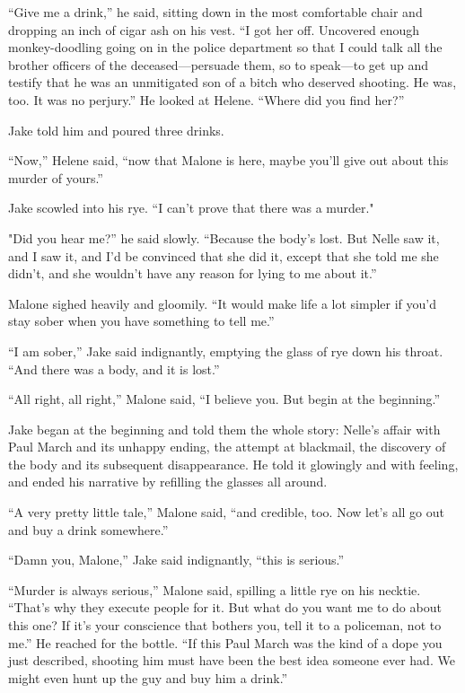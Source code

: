 \documentclass{novel}
\begin{document}
“Give me a drink,” he said, sitting down in the most comfortable chair and dropping an inch of cigar ash on his vest. “I got her off. Uncovered enough monkey-doodling going on in the police department so that I could talk all the brother officers of the deceased—persuade them, so to speak—to get up and testify that he was an unmitigated son of a bitch who deserved shooting. He was, too. It was no perjury.” He looked at Helene. “Where did you find her?”

Jake told him and poured three drinks.

“Now,” Helene said, “now that Malone is here, maybe you’ll give out about this murder of yours.”

Jake scowled into his rye. “I can’t prove that there was a murder."

"Did you hear me?” he said slowly. “Because the body’s lost. But Nelle saw it, and I saw it, and I'd be convinced that she did it, except that she told me she didn’t, and she wouldn’t have any reason for lying to me about it.”

Malone sighed heavily and gloomily. “It would make life a lot simpler if you’d stay sober when you have something to tell me.”

“I am sober,” Jake said indignantly, emptying the glass of rye down his throat. “And there was a body, and it is lost.”

“All right, all right,” Malone said, “I believe you. But begin at the beginning.”

Jake began at the beginning and told them the whole story: Nelle’s affair with Paul March and its unhappy ending, the attempt at blackmail, the discovery of the body and its subsequent disappearance. He told it glowingly and with feeling, and ended his narrative by refilling the glasses all around.

“A very pretty little tale,” Malone said, “and credible, too. Now let’s all go out and buy a drink somewhere.”

“Damn you, Malone,” Jake said indignantly, “this is serious.”

“Murder is always serious,” Malone said, spilling a little rye on his necktie. “That’s why they execute people for it. But what do you want me to do about this one? If it’s your conscience that bothers you, tell it to a policeman, not to me.” He reached for the bottle. “If this Paul March was the kind of a dope you just described, shooting him must have been the best idea someone ever had. We might even hunt up the guy and buy him a drink.”
\end{document}

